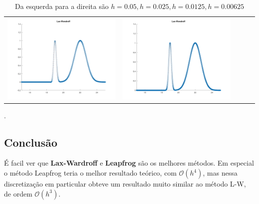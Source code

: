 \documentclass{article}
\begin{document}
\begin{table}[h]
\begin{tabular}{ccccc}
            \includegraphics[scale = 0.17]{LW4.png} & \includegraphics[scale = 0.17]{LW8.png}
        \end{tabular}
    \label{tbl:table_of_figures}
    \caption{Da esquerda para a direita são $h = 0.05, h = 0.025,h = 0.0125, h = 0.00625$}.
\end{table}

\subsection{Conclusão}
É facil ver que \textbf{Lax-Wardroff} e \textbf{Leapfrog} são os melhores métodos. Em especial o método Leapfrog teria o melhor resultado teórico, com $\mathcal{O}(h^4)$, mas nessa discretização em particular obteve um resultado muito similar ao método L-W, de ordem $\mathcal{O}(h^3)$.
\end{document}
